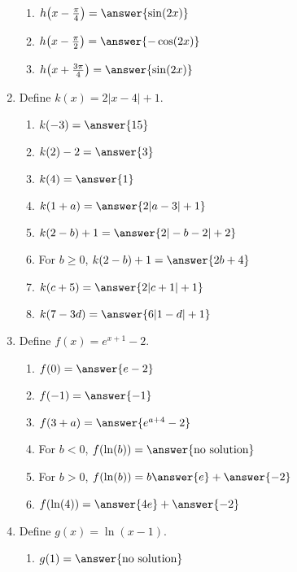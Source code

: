 \documentclass{ximera}
\begin{document}
\begin{exercise}
\begin{enumerate}
\begin{enumerate}
\item $h\!\left(x-\frac{\pi}{4}\right) = \answer{\sin(2x)}$

\item $h\!\left(x-\frac{\pi}{2}\right) = \answer{-\cos(2x)}$

\item $h\!\left(x+\frac{3\pi}{4}\right) = \answer{\sin(2x)}$
\end{enumerate}


\item Define $k(x)= 2|x-4|+1$.
\begin{enumerate}
\item $k(-3) = \answer{15}$

\item $k(2) -2 = \answer{3}$

\item $k(4) = \answer{1}$

\item $k(1+a)=\answer{2|a-3| +1}$

\item $k(2-b) +1 = \answer{2|-b-2|+2}$

\item For $b\geq0$, $k(2-b) +1 = \answer{2b+4}$

\item $k(c+5) = \answer{2|c+1|+1}$

\item $k(7-3d) = \answer{6|1-d|+1}$
\end{enumerate}

\item Define $f(x)= e^{x+1} -2$.
\begin{enumerate}
\item $f(0) = \answer{e-2}$

\item $f(-1) = \answer{-1}$

\item $f(3+a)=\answer{e^{a+4}-2}$

\item For $b<0$, $f(\ln(b)) = \answer{\text{no solution}}$

\item For $b>0$, $f(\ln(b)) = b\answer{e} + \answer{-2}$

\item $f(\ln(4)) = \answer{4e} + \answer{-2}$
\end{enumerate}

\item Define $g(x)= \ln(x-1)$.
\begin{enumerate}
\item $g(1) = \answer{\text{no solution}}$


\end{enumerate}
\end{enumerate}
\end{exercise}
\end{document}
